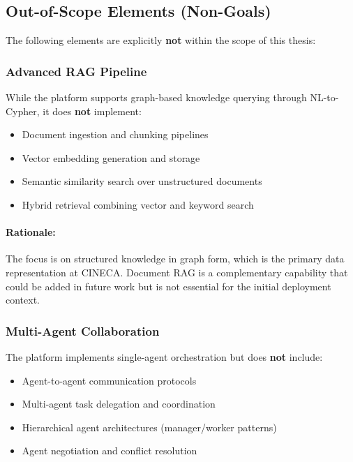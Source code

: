 \documentclass[a4paper,twoside]{sapthesis}
\begin{document}
\subsection{Out-of-Scope Elements (Non-Goals)}

The following elements are explicitly \textbf{not} within the scope of this thesis:

\subsubsection{Advanced RAG Pipeline}

While the platform supports graph-based knowledge querying through NL-to-Cypher, it does \textbf{not} implement:

\begin{itemize}
    \item Document ingestion and chunking pipelines
    \item Vector embedding generation and storage
    \item Semantic similarity search over unstructured documents
    \item Hybrid retrieval combining vector and keyword search
\end{itemize}

\paragraph{Rationale:} The focus is on structured knowledge in graph form, which is the primary data representation at CINECA. Document RAG is a complementary capability that could be added in future work but is not essential for the initial deployment context.

\subsubsection{Multi-Agent Collaboration}

The platform implements single-agent orchestration but does \textbf{not} include:

\begin{itemize}
    \item Agent-to-agent communication protocols
    \item Multi-agent task delegation and coordination
    \item Hierarchical agent architectures (manager/worker patterns)
    \item Agent negotiation and conflict resolution
\end{itemize}
\end{document}
